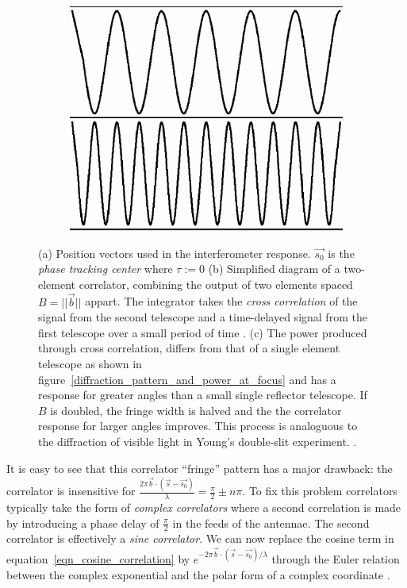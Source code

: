 \documentclass[a4paper,10pt]{report}
\begin{document}
\begin{figure}[ht]
\begin{mdframed}
\begin{subfigure}[b]{0.4\textwidth}
 \caption{}
 \end{subfigure}
 \begin{subfigure}[b]{0.2\textwidth}
 \includegraphics[width=\textwidth]{images/fringe.png}
 \caption{}
 \end{subfigure}
 \caption[Cosine correlator]{(a) Position vectors used in the interferometer response. $\vec{s_0}$ is the \textit{phase tracking center} where $\tau:=0$ \cite{taylor1999synthesis} (b) Simplified diagram of a two-element correlator, combining the output of two elements spaced $B=||\vec{b}||$ appart. The integrator takes the \textit{cross correlation} of the signal 
 from the second telescope and a time-delayed signal from the first telescope over a small period of time \cite{taylor1999synthesis}. (c) The power produced through cross correlation, differs from that of a single element telescope as shown in figure~\ref{diffraction_pattern_and_power_at_focus} and has a response for greater angles than a small single reflector telescope. If $B$ is doubled, 
 the fringe width is halved and the the correlator response for larger angles improves. This process is analoguous to the diffraction of visible light in Young's double-slit experiment. \cite{wilson2009tools}.}
  \label{fig_cosine_correlator}
 \end{mdframed}
\end{figure}
It is easy to see that this correlator ``fringe'' pattern has a major drawback: the correlator is insensitive for $\frac{2\pi\vec{b}\cdot(\vec{s}-\vec{s_0})}{\lambda} = \frac{\pi}{2} \pm n\pi$. To fix this problem correlators typically
take the form of \textit{complex correlators} where a second correlation is made by introducing a phase delay of $\frac{\pi}{2}$ in the feeds of the antennae. The second correlator is effectively a \textit{sine correlator}. We can
now replace the cosine term in equation~\ref{eqn_cosine_correlation} by $e^{-2\pi\vec{b}\cdot(\vec{s}-\vec{s_0})/\lambda}$ through the Euler relation between the complex exponential and the polar form of a complex coordinate \cite{taylor1999synthesis}.
\end{document}
